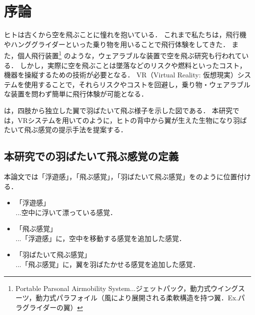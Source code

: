 \chapter[序論]%
        {序論}


        ヒトは古くから空を飛ぶことに憧れを抱いている．
        これまで私たちは，飛行機やハンググライダーといった乗り物を用いることで飛行体験をしてきた．
        また，個人飛行装置\footnote{Portable Parsonal Airmobility System...ジェットパック，動力式ウイングスーツ，動力式パラフォイル（風により展開される柔軟構造を持つ翼．Ex.パラグライダーの翼）}
        のような，ウェアラブルな装置で空を飛ぶ研究も行われている\cite{gravityindustries}．
        しかし，実際に空を飛ぶことは墜落などのリスクや燃料といったコスト，機器を操縦するための技術が必要となる．
        VR（Virtual Reality: 仮想現実）システムを使用することで，それらリスクやコストを回避し，乗り物・ウェアラブルな装置を問わず簡単に飛行体験が可能となる．

        は，四肢から独立した翼で羽ばたいて飛ぶ様子を示した図である．
        本研究では，VRシステムを用いてのように，ヒトの背中から翼が生えた生物になり羽ばたいて飛ぶ感覚の提示手法を提案する．

\section{本研究での羽ばたいて飛ぶ感覚の定義}
        本論文では「浮遊感」，「飛ぶ感覚」，「羽ばたいて飛ぶ感覚」をのように位置付ける．

        \begin{itemize}
                \item 「浮遊感」\\
                ...空中に浮いて漂っている感覚．
                \item 「飛ぶ感覚」\\
                ...「浮遊感」に，空中を移動する感覚を追加した感覚．
                \item 「羽ばたいて飛ぶ感覚」\\
                ...「飛ぶ感覚」に，翼を羽ばたかせる感覚を追加した感覚．
        \end{itemize}

